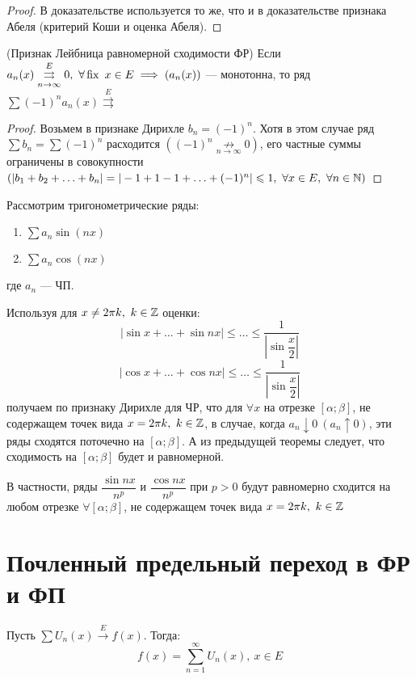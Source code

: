 \documentclass[../../main.tex]{subfiles}
\begin{document}
\begin{proof}
В доказательстве используется то же, что и в доказательстве 
признака Абеля (критерий Коши и оценка Абеля).
\end{proof}

\begin{crl*} (Признак Лейбница равномерной сходимости ФР)
Если $a_n(x) \overset{E}
{\underset{n \to \infty}\rightrightarrows} 0,\ \forall \operatorname{fix} \ x \in E \implies
(a_n(x))$ --- монотонна, то ряд $\sum (-1)^n a_n(x) \overset{E}
{\rightrightarrows}$ 	
\end{crl*}

\begin{proof}
Возьмем в признаке Дирихле $b_n=(-1)^n$. Хотя в этом случае ряд 
$\sum b_n = \sum (-1)^n$ расходится $((-1)^n 
\underset{n \to \infty}{\not \longrightarrow} 0)$, его частные суммы
ограничены в совокупности $(|b_1 + b_2 + \ldots + b_n| = 
|-1+1-1+ \ldots + (-1)^n| \leqslant 1,\ \forall x \in E,\ \forall n \in \mathbb{N})$
\end{proof}	

\begin{exmps}
Рассмотрим тригонометрические ряды: 
	\begin{enumerate}
		\item $\sum a_n \sin(nx)$
		\item $\sum a_n \cos(nx)$
	\end{enumerate}
где $a_n$ --- ЧП.

Используя для $x \neq 2\pi k,\ k \in \mathbb{Z}$ оценки:
\[ \left|\sin{x} + \ldots + \sin{nx}\right| \leq \ldots
\leq \dfrac{1}{\left|\sin\dfrac{x}{2}\right|} \]
\[ \left|\cos{x} + \ldots + \cos{nx}\right| \leq \ldots
\leq \dfrac{1}{\left|\sin\dfrac{x}{2}\right|} \]
получаем по признаку Дирихле для ЧР, что для
$\forall x$ на отрезке $[\alpha; \beta]$, не содержащем точек вида 
$x = 2\pi k,\ k \in \mathbb{Z}$, в случае, когда $a_n \downarrow 0 \ (a_n \uparrow 0)$,
эти ряды сходятся поточечно на $[\alpha; \beta]$. А 
из предыдущей теоремы следует, что сходимость на $[\alpha; \beta]$ 
будет и равномерной.

В частности, ряды $\dfrac{\sin{nx}}{n^p}$ и $\dfrac{\cos{nx}}{n^p}$ при
$p > 0$ будут равномерно сходится на любом отрезке $\forall [\alpha; \beta]$,
не содержащем точек вида $x = 2\pi k,\ k \in \mathbb{Z}$ 
\end{exmps}

\section{Почленный предельный переход в ФР и ФП}
Пусть $\sum U_n(x) \overset{E}{\longrightarrow} f(x)$. Тогда:
\begin{equation}
	\label{lec2:15}
	f(x) = \sum\limits_{n = 1}^{\infty} U_n(x),\ x \in E
\end{equation}
\end{document}
